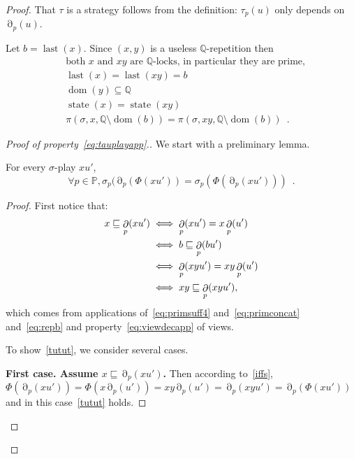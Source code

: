 \documentclass[a4paper,UKenglish]{lipics-v2016}
\newcommand{\PP}{\mathbb{P}}
\newcommand{\QQ}{\mathbb{Q}}
\newcommand{\pref}{\sqsubseteq}
\DeclareMathOperator{\dom}{dom}
\DeclareMathOperator{\view}{\partial}
\DeclareMathOperator{\last}{last}
\DeclareMathOperator{\state}{state}
\begin{document}
\begin{proof}

That $\tau$ is a strategy follows from the definition: $\tau_p(u)$ only depends on $\view_p(u)$.


Let $b=\last(x)$.
Since $(x,y)$ is a useless $\QQ$-repetition then
\begin{align}
\label{eq:replocks}
&\text{both $x$ and $xy$ are $\QQ$-locks, in particular they are prime,}
\\
\label{eq:repb}
&\last(x)=\last(xy)=b\\
\label{eq:repincl}
&\dom(y)\subseteq \QQ\\
\label{eq:repstates}
&\state(x)=\state(xy)\\
\label{eq:repsigma}
&
\pi\left(\sigma,x,\QQ\setminus\dom(b)\right)
=
\pi\left(\sigma,xy,\QQ\setminus\dom(b)\right)
\enspace.
\end{align}
\begin{proof}[Proof of property~\eqref{eq:tauplayapp}.]
We start with a preliminary lemma.

\begin{lemma}
\label{lem:tutut}
For every $\sigma$-play $xu'$,
\begin{equation}
\label{tutut}
\forall p \in\PP,
\sigma_p(\view_p(\Phi(xu'))
=
\sigma_p(\Phi(\view_p(xu')))\enspace.
\end{equation}
\end{lemma}
\begin{proof}
First notice that:
\begin{align}
\notag x \pref \view_p(xu') &\iff \view_p(xu')=x\view_p(u') \\
\notag &\iff b \pref \view_p(bu')
\\
\label{iffs}&\iff \view_p(xyu')=xy\view_p(u')\\
\notag& \iff xy \pref\view_p(xyu'),
\end{align}
which comes from applications
of~\eqref{eq:primsuff4} and~\eqref{eq:primconcat}
and~\eqref{eq:repb} and property~\eqref{eq:viewdecapp} of views.


To show~\eqref{tutut}, we consider several cases.

\medskip

{\bf First case.
Assume $x\pref \view_p(xu')$.}
Then according to~\eqref{iffs},
$\Phi(\view_p(xu'))=\Phi(x\view_p(u'))=xy\view_p(u') = \view_p(xyu') = \view_p(\Phi(xu'))$
and in this case~\eqref{tutut} holds.

\medskip


\end{proof}
\end{proof}
\end{proof}
\end{document}
